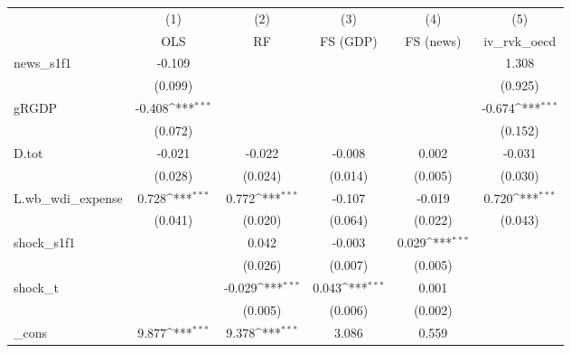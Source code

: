 {
\def\sym#1{\ifmmode^{#1}\else\(^{#1}\)\fi}
\begin{tabular}{l*{5}{c}}
\toprule
            &\multicolumn{1}{c}{(1)}&\multicolumn{1}{c}{(2)}&\multicolumn{1}{c}{(3)}&\multicolumn{1}{c}{(4)}&\multicolumn{1}{c}{(5)}\\
            &\multicolumn{1}{c}{OLS}&\multicolumn{1}{c}{RF}&\multicolumn{1}{c}{FS (GDP)}&\multicolumn{1}{c}{FS (news)}&\multicolumn{1}{c}{iv\_rvk\_oecd}\\
\midrule
news\_s1f1   &      -0.109         &                     &                     &                     &       1.308         \\
            &     (0.099)         &                     &                     &                     &     (0.925)         \\
\addlinespace
gRGDP       &      -0.408\sym{***}&                     &                     &                     &      -0.674\sym{***}\\
            &     (0.072)         &                     &                     &                     &     (0.152)         \\
\addlinespace
D.tot       &      -0.021         &      -0.022         &      -0.008         &       0.002         &      -0.031         \\
            &     (0.028)         &     (0.024)         &     (0.014)         &     (0.005)         &     (0.030)         \\
\addlinespace
L.wb\_wdi\_expense&       0.728\sym{***}&       0.772\sym{***}&      -0.107         &      -0.019         &       0.720\sym{***}\\
            &     (0.041)         &     (0.020)         &     (0.064)         &     (0.022)         &     (0.043)         \\
\addlinespace
shock\_s1f1  &                     &       0.042         &      -0.003         &       0.029\sym{***}&                     \\
            &                     &     (0.026)         &     (0.007)         &     (0.005)         &                     \\
\addlinespace
shock\_t     &                     &      -0.029\sym{***}&       0.043\sym{***}&       0.001         &                     \\
            &                     &     (0.005)         &     (0.006)         &     (0.002)         &                     \\
\addlinespace
\_cons      &       9.877\sym{***}&       9.378\sym{***}&       3.086         &       0.559         &                     \\

\end{tabular}}
